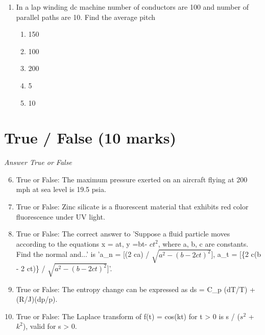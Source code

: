 \documentclass[12pt]{article}
\begin{document}
\begin{enumerate}[label=\arabic*.]
\begin{enumerate}[label=(\alph*)]
    \item C= (\ensuremath{\epsilonS}/ $d^2$)
    \item C= (\ensuremath{\epsilonS}/ d)
    \item C= (\ensuremath{\epsilon}/ dS)
\end{enumerate}
\item In a lap winding dc machine number of conductors are 100 and number of parallel paths are 10. Find the average pitch
\begin{enumerate}[label=(\alph*)]
    \item 150
    \item 100
    \item 200
    \item 5
    \item 10
\end{enumerate}
\end{enumerate}

\section*{True / False (10 marks)}
\textit{Answer True or False}
\begin{enumerate}[label=\arabic*.]
\setcounter{enumi}{5}
\item True or False: The maximum pressure exerted on an aircraft flying at 200 mph at sea level is 19.5 psia.
\item True or False: Zinc silicate is a fluorescent material that exhibits red color fluorescence under UV light.
\item True or False: The correct answer to 'Suppose a fluid particle moves according to the equations x = at, y =bt- $ct^2$, where a, b, c are constants. Find the normal and...' is 'a\_n = [(2 ca) / \ensuremath{\surd{a^2 - (b - 2 ct)^2}}], a\_t = [\{2 c(b - 2 ct)\} / \ensuremath{\surd{a^2 - (b - 2 ct)^2}}]'.
\item True or False: The entropy change can be expressed as ds = C\_p (dT/T) + (R/J)(dp/p).
\item True or False: The Laplace transform of f(t) = cos(kt) for t \textgreater{} 0 is s / ($s^2$ + $k^2$), valid for s \textgreater{} 0.
\end{enumerate}
\end{document}
